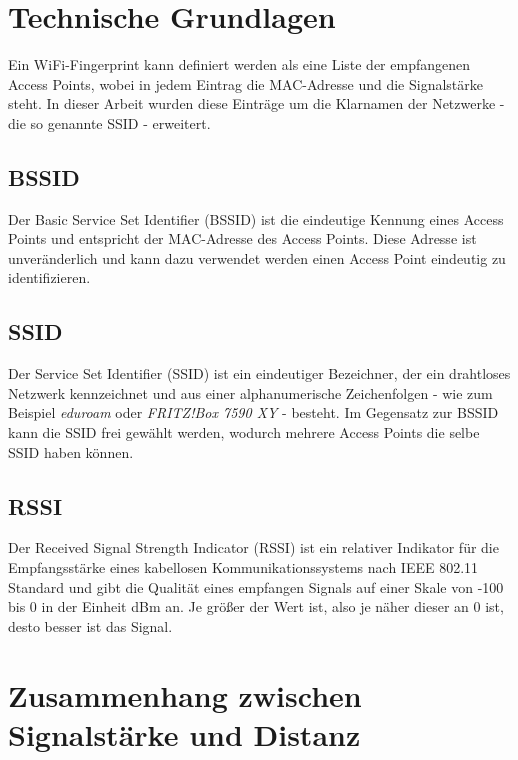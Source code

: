 \section{Technische Grundlagen}

Ein WiFi-Fingerprint kann definiert werden als eine Liste der empfangenen Access Points, wobei in jedem Eintrag die MAC-Adresse und die Signalstärke steht. In dieser Arbeit wurden diese Einträge um die Klarnamen der Netzwerke - die so genannte SSID - erweitert.

\subsection{BSSID}

Der Basic Service Set Identifier (BSSID) ist die eindeutige Kennung eines Access Points und entspricht der MAC-Adresse des Access Points. Diese Adresse ist unveränderlich und kann dazu verwendet werden  einen Access Point eindeutig zu identifizieren.

\subsection{SSID}

Der Service Set Identifier (SSID) ist ein eindeutiger Bezeichner, der ein drahtloses Netzwerk kennzeichnet und aus einer alphanumerische Zeichenfolgen - wie zum Beispiel \textit{eduroam} oder \textit{FRITZ!Box 7590 XY} - besteht. Im Gegensatz zur BSSID kann die SSID frei gewählt werden, wodurch mehrere Access Points die selbe SSID haben können. %

\subsection{RSSI} \label{rssi}

Der Received Signal Strength Indicator (RSSI) ist ein relativer Indikator für die Empfangsstärke eines kabellosen Kommunikationssystems nach IEEE 802.11 Standard und gibt die Qualität eines empfangen Signals auf einer Skale von -100 bis 0 in der Einheit dBm an. Je größer der Wert ist, also je näher dieser an 0 ist, desto besser ist das Signal.

\section{Zusammenhang zwischen Signalstärke und Distanz} \label{pfadverlustmodell}

